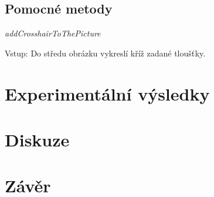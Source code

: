 \documentclass[a4paper,10pt]{article}
\begin{document}

\subsection{Pomocné metody}

\textit{addCrosshairToThePicture}

Vstup:
Do středu obrázku vykreslí kříž zadané tloušťky. 


\section{Experimentální výsledky}


\section{Diskuze}
\section{Závěr}
\end{document}
